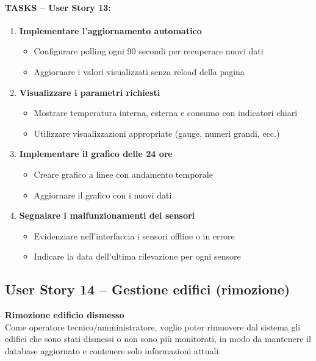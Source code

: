 \paragraph*{TASKS – User Story 13:}
\begin{enumerate}
    \item \textbf{Implementare l'aggiornamento automatico}
    \begin{itemize}
        \item Configurare polling ogni 90 secondi per recuperare nuovi dati
        \item Aggiornare i valori visualizzati senza reload della pagina
    \end{itemize}
    \item \textbf{Visualizzare i parametri richiesti}
    \begin{itemize}
        \item Mostrare temperatura interna, esterna e consumo con indicatori chiari
        \item Utilizzare visualizzazioni appropriate (gauge, numeri grandi, ecc.)
    \end{itemize}
    \item \textbf{Implementare il grafico delle 24 ore}
    \begin{itemize}
        \item Creare grafico a linee con andamento temporale
        \item Aggiornare il grafico con i nuovi dati
    \end{itemize}
    \item \textbf{Segnalare i malfunzionamenti dei sensori}
    \begin{itemize}
        \item Evidenziare nell'interfaccia i sensori offline o in errore
        \item Indicare la data dell'ultima rilevazione per ogni sensore
    \end{itemize}
\end{enumerate}


\subsection{User Story 14 – Gestione edifici (rimozione)}
\label{us:rimozioneEdificio}

\textbf{Rimozione edificio dismesso} \\
Come operatore tecnico/amministratore, voglio poter rimuovere dal sistema gli edifici che sono stati dismessi o non sono più monitorati, in modo da mantenere il database aggiornato e contenere solo informazioni attuali.

